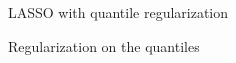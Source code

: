 \documentclass[11pt]{beamer}
\begin{document}
\begin{frame}{LASSO with quantile regularization}
%

\end{frame}

\begin{frame}{Regularization on the quantiles}


\end{frame}
\end{document}
